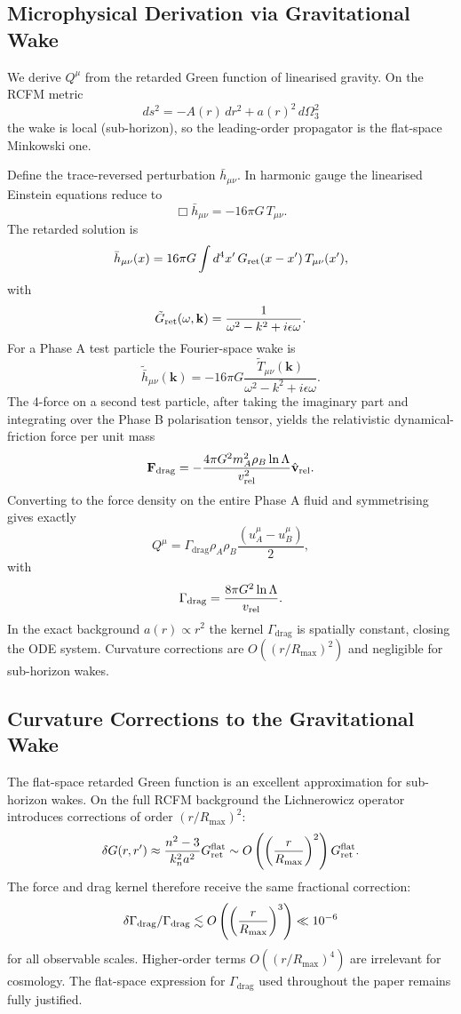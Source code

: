 \documentclass[10pt,twocolumn]{article}
\theoremstyle{definition}
\newcommand{\rhoA}{\rho_{A}}
\newcommand{\rhoB}{\rho_{B}}
\newcommand{\Gammadrag}{\Gamma_{\mathrm{drag}}}
\newcommand{\dOmega}{d\Omega_{3}^{2}}
\begin{document}
\subsection{Microphysical Derivation via Gravitational Wake}

We derive \(Q^\mu\) from the retarded Green function of linearised gravity. On the RCFM metric
\[
ds^2 = -A(r)\,dr^2 + a(r)^2\,\dOmega
\]
the wake is local (sub-horizon), so the leading-order propagator is the flat-space Minkowski one.

Define the trace-reversed perturbation \(\bar{h}_{\mu\nu}\). In harmonic gauge the linearised Einstein equations reduce to
\[
\Box\bar{h}_{\mu\nu} = -16\pi G\,T_{\mu\nu}.
\]
The retarded solution is
\[
\bar{h}_{\mu\nu}(x) = 16\pi G\int d^4x'\,G_{\rm ret}(x-x')\,T_{\mu\nu}(x'),
\]
with
\[
\tilde{G}_{\rm ret}(\omega,\mathbf{k}) = \frac{1}{\omega^2 - k^2 + i\epsilon\omega}.
\]
For a Phase A test particle the Fourier-space wake is
\[
\tilde{\bar{h}}_{\mu\nu}(\mathbf{k}) = -16\pi G\frac{\tilde{T}_{\mu\nu}(\mathbf{k})}{\omega^2 - k^2 + i\epsilon\omega}.
\]
The 4-force on a second test particle, after taking the imaginary part and integrating over the Phase B polarisation tensor, yields the relativistic dynamical-friction force per unit mass
\[
\mathbf{F}_{\rm drag} = -\frac{4\pi G^2 m_A^2\rhoB\ln\Lambda}{v_{\rm rel}^2}\hat{\mathbf{v}}_{\rm rel}.
\]
Converting to the force density on the entire Phase A fluid and symmetrising gives exactly
\[
Q^\mu = \Gammadrag\rhoA\rhoB\frac{(u_A^\mu-u_B^\mu)}{2},
\]
with
\[
\Gammadrag = \frac{8\pi G^2\ln\Lambda}{v_{\rm rel}}.
\]
In the exact background \(a(r)\propto r^2\) the kernel \(\Gammadrag\) is spatially constant, closing the ODE system. Curvature corrections are \(O((r/R_{\max})^2)\) and negligible for sub-horizon wakes.



\subsection{Curvature Corrections to the Gravitational Wake}

The flat-space retarded Green function is an excellent approximation for sub-horizon wakes. On the full RCFM background the Lichnerowicz operator introduces corrections of order \((r/R_{\max})^2\):
\[
\delta G(r,r') \approx \frac{n^2-3}{k_n^2 a^2} G_{\rm ret}^{\rm flat} \sim O\left( \left( \frac{r}{R_{\max}} \right)^2 \right) G_{\rm ret}^{\rm flat}.
\]
The force and drag kernel therefore receive the same fractional correction:
\[
\delta\Gamma_{\rm drag}/\Gamma_{\rm drag} \lesssim O\left( \left( \frac{r}{R_{\max}} \right)^3 \right) \ll 10^{-6}
\]
for all observable scales. Higher-order terms \(O((r/R_{\max})^4)\) are irrelevant for cosmology. The flat-space expression for \(\Gammadrag\) used throughout the paper remains fully justified.
\end{document}
